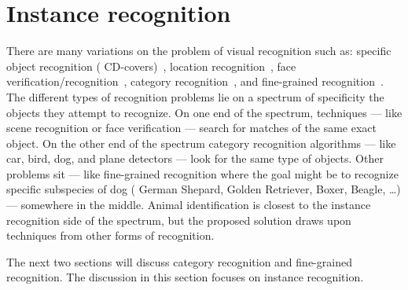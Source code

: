 \section{Instance recognition}\label{sec:ir}
    There are many variations on the problem of visual recognition such as:
    specific object recognition (\eg{}
      CD-covers)~\cite{lowe_distinctive_2004,sivic_efficient_2009,nister_scalable_2006},
    location recognition~\cite{jegou_hamming_2008,jegou_aggregating_2012,tolias_aggregate_2013},
    face
      verification/recognition~\cite{chopra_learning_2005,huang_labeled_2007,berg_tomvspete_2012,chen_blessing_2013,taigman_deepface_2014,schroff_facenet_2015},
    category
      recognition~\cite{lazebnik_beyond_2006,zhang_local_2006,mccann_local_2012,boiman_defense_2008},
    and fine-grained recognition~\cite{parkhi_cats_2012,berg_poof_2013, gavves_local_2014}.
    The different types of recognition problems lie on a spectrum of specificity \wrt{} the
      objects they attempt to recognize.
    On one end of the spectrum,  techniques --- like scene
      recognition or face verification --- search for matches of the same exact object.
    On the other end of the spectrum category recognition algorithms --- like car, bird, dog, and
      plane detectors --- look for the same type of objects.
    Other problems sit --- like fine-grained recognition where the goal might be to recognize
      specific subspecies of dog (\eg{} German Shepard, Golden Retriever, Boxer, Beagle, \ldots{})
      --- somewhere in the middle.
    Animal identification is closest to the instance recognition side of the spectrum, but the
      proposed solution draws upon techniques from other forms of recognition.

    The next two sections will discuss category recognition and
      fine-grained recognition.
    The discussion in this section focuses on instance recognition.

